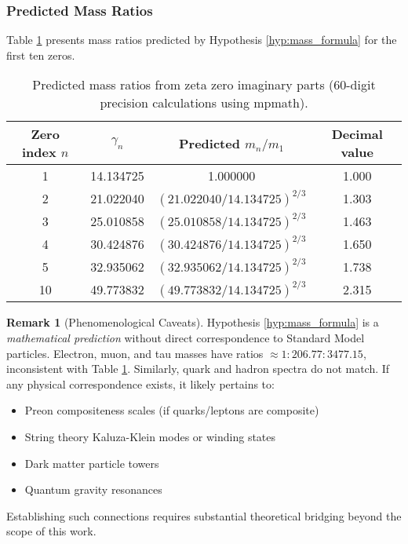 \documentclass[12pt]{article}
\theoremstyle{plain}
\theoremstyle{definition}
\newtheorem{remark}[theorem]{Remark}
\begin{document}
\subsubsection{Predicted Mass Ratios}

Table \ref{tab:mass_spectrum} presents mass ratios predicted by Hypothesis \ref{hyp:mass_formula} for the first ten zeros.

\begin{table}[H]
\centering
\begin{tabular}{cccc}
\hline
Zero index $n$ & $\gamma_n$ & Predicted $m_n/m_1$ & Decimal value \\
\hline
1 & 14.134725 & 1.000000 & 1.000 \\
2 & 21.022040 & $(21.022040/14.134725)^{2/3}$ & 1.303 \\
3 & 25.010858 & $(25.010858/14.134725)^{2/3}$ & 1.463 \\
4 & 30.424876 & $(30.424876/14.134725)^{2/3}$ & 1.650 \\
5 & 32.935062 & $(32.935062/14.134725)^{2/3}$ & 1.738 \\
10 & 49.773832 & $(49.773832/14.134725)^{2/3}$ & 2.315 \\
\hline
\end{tabular}
\caption{Predicted mass ratios from zeta zero imaginary parts (60-digit precision calculations using mpmath).}
\label{tab:mass_spectrum}
\end{table}

\begin{remark}[Phenomenological Caveats]
Hypothesis \ref{hyp:mass_formula} is a \emph{mathematical prediction} without direct correspondence to Standard Model particles. Electron, muon, and tau masses have ratios $\approx 1 : 206.77 : 3477.15$, inconsistent with Table \ref{tab:mass_spectrum}. Similarly, quark and hadron spectra do not match. If any physical correspondence exists, it likely pertains to:
\begin{itemize}
\item Preon compositeness scales (if quarks/leptons are composite)
\item String theory Kaluza-Klein modes or winding states
\item Dark matter particle towers
\item Quantum gravity resonances
\end{itemize}
Establishing such connections requires substantial theoretical bridging beyond the scope of this work.
\end{remark}
\end{document}
